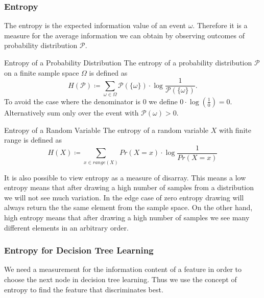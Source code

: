 \documentclass{panikzettel}
\begin{document}
\subsubsection{Entropy}
The entropy is the expected information value of an event $\omega$. Therefore it is a measure for the average information we can obtain by observing outcomes of probability distribution $\mathcal{P}$.

\begin{halfboxl}
\vspace{-\baselineskip}
\begin{defi}{Entropy of a Probability Distribution}
The entropy of a probability distribution $\mathcal{P}$ on a finite sample space $\Omega$ is defined as
\[
H(\mathcal{P})\coloneqq \sum_{\omega\in\Omega}\mathcal{P}(\{\omega \})\cdot \log\frac{1}{\mathcal{P}(\{\omega \})}.
\]
To avoid the case where the denominator is 0 we define $0\cdot \log (\frac{1}{0})=0$. Alternatively sum only over the event with $\mathcal{P}(\omega)>0$.
\end{defi}
\end{halfboxl}
\begin{halfboxr}
\vspace{-\baselineskip}
\begin{defi}{Entropy of a Random Variable}
The entropy of a random variable $X$ with finite range is defined as
\[
H(X)\coloneqq \sum_{x\in range(X)}Pr(X=x)\cdot\log \frac{1}{Pr(X=x)}
\]
\end{defi}
\end{halfboxr}

It is also possible to view entropy as a measure of disarray. This means a low entropy means that after drawing a high number of samples from a distribution we will not see much variation. In the edge case of zero entropy drawing will always return the the same element from the sample space. On the other hand, high entropy means that after drawing a high number of samples we see many different elements in an arbitrary order.



\subsubsection{Entropy for Decision Tree Learning}
\label{entropy_decision_trees}
We need a measurement for the information content of a feature in order to choose the next node in decision tree learning. Thus we use the concept of entropy to find the feature that discriminates best.
\end{document}
